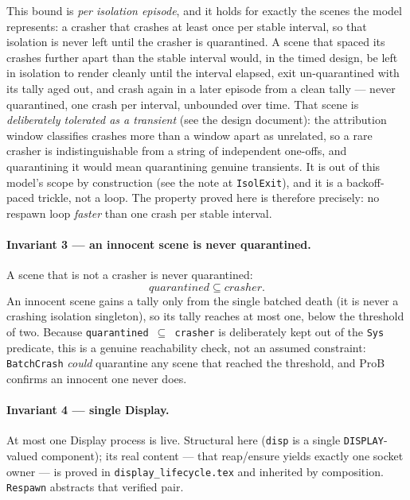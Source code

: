 \documentclass[a4paper,10pt,fleqn]{article}
\begin{document}
This bound is \emph{per isolation episode}, and it holds for exactly the scenes the
model represents: a crasher that crashes at least once per stable interval, so
that isolation is never left until the crasher is quarantined.  A scene that
spaced its crashes further apart than the stable interval would, in the timed
design, be left in isolation to render cleanly until the interval elapsed, exit
un-quarantined with its tally aged out, and crash again in a later episode from a
clean tally --- never quarantined, one crash per interval, unbounded over time.
That scene is \emph{deliberately tolerated as a transient} (see the design
document): the attribution window classifies crashes more than a window apart as
unrelated, so a rare crasher is indistinguishable from a string of independent
one-offs, and quarantining it would mean quarantining genuine transients.  It is
out of this model's scope by construction (see the note at \texttt{IsolExit}), and
it is a backoff-paced trickle, not a loop.  The property proved here is therefore
precisely: no respawn loop \emph{faster} than one crash per stable interval.

\paragraph{Invariant 3 --- an innocent scene is never quarantined.}
A scene that is not a crasher is never quarantined:
\[
  quarantined \subseteq crasher.
\]
An innocent scene gains a tally only from the single batched death (it is never a
crashing isolation singleton), so its tally reaches at most one, below the
threshold of two.  Because \texttt{quarantined $\subseteq$ crasher} is deliberately
kept out of the \texttt{Sys} predicate, this is a genuine reachability check, not
an assumed constraint: \texttt{BatchCrash} \emph{could} quarantine any scene that
reached the threshold, and ProB confirms an innocent one never does.

\paragraph{Invariant 4 --- single Display.}
At most one Display process is live.  Structural here (\texttt{disp} is a single
\texttt{DISPLAY}-valued component); its real content --- that reap/ensure yields
exactly one socket owner --- is proved in \texttt{display\_lifecycle.tex} and
inherited by composition.  \texttt{Respawn} abstracts that verified pair.

\end{document}
